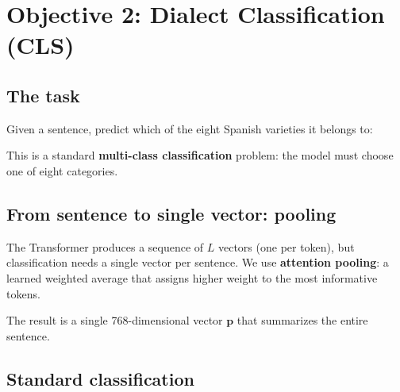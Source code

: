 \documentclass[11pt,a4paper]{article}
\theoremstyle{definition}
\begin{document}
\section{Objective 2: Dialect Classification (CLS)}
\label{sec:cls}

\subsection{The task}

Given a sentence, predict which of the eight Spanish varieties it
belongs to:

\begin{center}
\end{center}

This is a standard \textbf{multi-class classification} problem: the
model must choose one of eight categories.

\subsection{From sentence to single vector: pooling}

The Transformer produces a sequence of $L$ vectors (one per token),
but classification needs a single vector per sentence. We use
\textbf{attention pooling}: a learned weighted average that assigns
higher weight to the most informative tokens.

The result is a single 768-dimensional vector $\mathbf{p}$ that
summarizes the entire sentence.

\subsection{Standard classification}
\end{document}
